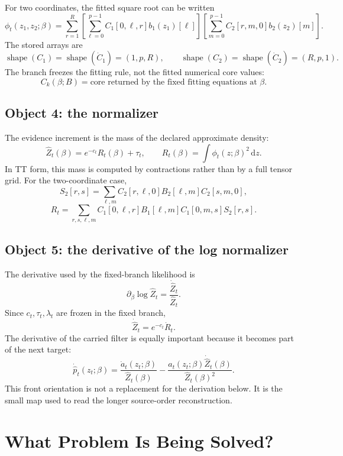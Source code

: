 \documentclass[11pt]{article}
\newcommand{\dd}{\,\mathrm d}
\newcommand{\shape}{\operatorname{shape}}
\begin{document}
For two coordinates, the fitted square root can be written
\[
    \phi_t(z_1,z_2;\beta)
    =
    \sum_{r=1}^{R}
    \left[
    \sum_{\ell=0}^{p-1}C_1[0,\ell,r]b_1(z_1)[\ell]
    \right]
    \left[
    \sum_{m=0}^{p-1}C_2[r,m,0]b_2(z_2)[m]
    \right].
    \tag{P22-O10}
\]
The stored arrays are
\[
    \shape(C_1)=\shape(\dot C_1)=(1,p,R),
    \qquad
    \shape(C_2)=\shape(\dot C_2)=(R,p,1).
    \tag{P22-O11}
\]
The branch freezes the fitting rule, not the fitted numerical core values:
\[
    C_k(\beta;B)
    =
    \text{core returned by the fixed fitting equations at }\beta.
    \tag{P22-O12}
\]

\subsection*{Object 4: the normalizer}

The evidence increment is the mass of the declared approximate density:
\[
    \widehat Z_t(\beta)
    =
    e^{-c_t}R_t(\beta)+\tau_t,
    \qquad
    R_t(\beta)=\int\phi_t(z;\beta)^2\dd z.
    \tag{P22-O13}
\]
In TT form, this mass is computed by contractions rather than by a full tensor
grid.  For the two-coordinate case,
\[
    S_2[r,s]
    =
    \sum_{\ell,m}
    C_2[r,\ell,0]B_2[\ell,m]C_2[s,m,0],
    \tag{P22-O14}
\]
\[
    R_t
    =
    \sum_{r,s,\ell,m}
    C_1[0,\ell,r]B_1[\ell,m]C_1[0,m,s]S_2[r,s].
    \tag{P22-O15}
\]

\subsection*{Object 5: the derivative of the log normalizer}

The derivative used by the fixed-branch likelihood is
\[
    \partial_\beta\log\widehat Z_t
    =
    \frac{\dot{\widehat Z}_t}{\widehat Z_t}.
    \tag{P22-O16}
\]
Since \(c_t,\tau_t,\lambda_t\) are frozen in the fixed branch,
\[
    \dot{\widehat Z}_t=e^{-c_t}\dot R_t.
    \tag{P22-O17}
\]
The derivative of the carried filter is equally important because it becomes
part of the next target:
\[
    \dot{\widehat p}_t(z_t;\beta)
    =
    \frac{\dot a_t(z_t;\beta)}{\widehat Z_t(\beta)}
    -
    \frac{a_t(z_t;\beta)\dot{\widehat Z}_t(\beta)}
    {\widehat Z_t(\beta)^2}.
    \tag{P22-O18}
\]
This front orientation is not a replacement for the derivation below.  It is
the small map used to read the longer source-order reconstruction.

\section{What Problem Is Being Solved?}
\end{document}
